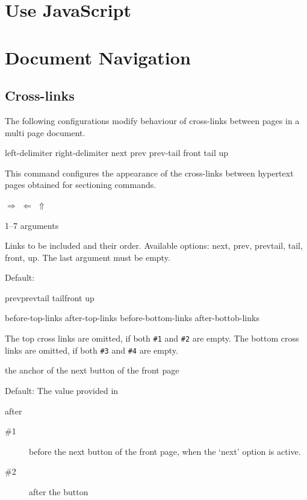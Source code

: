 \documentclass{book}
\begin{document}
\section{Use JavaScript}
\section{Document Navigation}

\subsection{Cross-links}

The following configurations modify behaviour of cross-links between pages in a multi page document.

 {left-delimiter} {right-delimiter} {next} {prev} {prev-tail} {front} {tail} {up}\EndDoc

This command configures the appearance of the cross-links between hypertext pages obtained for sectioning commands.

\begin{texsource}
   {}{}{$\scriptstyle\Rightarrow$}
   {$\scriptstyle\Leftarrow$}
   {}{}{}{$\scriptstyle\Uparrow$}
\end{texsource}

 {1--7 arguments}\EndDoc

  Links to be included and their order. Available
  options: next, prev, prevtail, tail, front, up.
  The last argument must be empty.

  Default:

\begin{texsource}
   {prev}{prevtail}
   {tail}{front}
   {up}{}
\end{texsource}

 {before-top-links} {after-top-links} {before-bottom-links} {after-bottob-links}\EndDoc

The top cross links are omitted, if both \verb|#1| and \verb|#2| are empty.
The bottom cross links are omitted, if both \verb|#3| and \verb|#4| are empty.

 {the anchor of the next button of the front page}\EndDoc

Default: The value provided in 

 {after}\EndDoc

\begin{description}
  \item[\#1]  before the next button of the front page, when the `next'
       option is active.
  \item[\#2]  after the button
\end{description}
\end{document}
